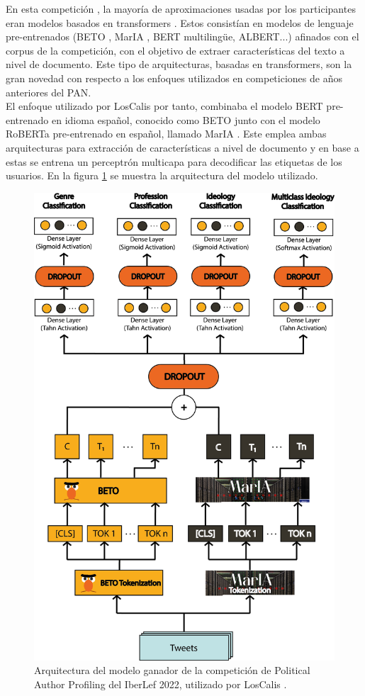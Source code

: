 En esta competición \cite{iberlef2022}, la mayoría de aproximaciones usadas por los participantes eran modelos basados en transformers \cite{vaswani2017attention}. Estos consistían en modelos de lenguaje pre-entrenados (BETO \cite{BETO}, MarIA \cite{MarIA}, BERT multilingüe, ALBERT...) afinados con el corpus de la competición, con el objetivo de extraer características del texto a nivel de documento. Este tipo de arquitecturas, basadas en transformers, son la gran novedad con respecto a los enfoques utilizados en competiciones de años anteriores del PAN. \\


El enfoque utilizado por LosCalis \cite{loscalis22} por tanto, combinaba el modelo BERT \cite{devlin2019bert} pre-entrenado en idioma español, conocido como BETO \cite{BETO} junto con el modelo RoBERTa pre-entrenado en español, llamado MarIA \cite{MarIA}. Este emplea ambas arquitecturas para extracción de características a nivel de documento y en base a estas se entrena un perceptrón multicapa para decodificar las etiquetas de los usuarios. En la figura \ref{fig:arquitectura} se muestra la arquitectura del modelo utilizado.

\noindent\begin{figure}[hp!]
  \centering
    \includegraphics[height=0.8\textwidth]{imaxes/arquitectura_.png}
  \caption{Arquitectura del modelo ganador de la competición de Political Author Profiling del IberLef 2022, utilizado por LosCalis \cite{loscalis22}.}
  \label{fig:arquitectura}
\end{figure}

